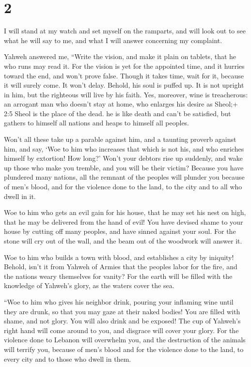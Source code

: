 \hypertarget{section-1}{%
\section{2}\label{section-1}}

 I will stand at my watch and set myself on the ramparts,
and will look out to see what he will say to me, and what I will answer
concerning my complaint.

 Yahweh answered me, ``Write the vision, and make it plain
on tablets, that he who runs may read it.  For the vision is
yet for the appointed time, and it hurries toward the end, and won't
prove false. Though it takes time, wait for it, because it will surely
come. It won't delay.  Behold, his soul is puffed up. It is
not upright in him, but the righteous will live by his faith.
 Yes, moreover, wine is treacherous: an arrogant man who
doesn't stay at home, who enlarges his desire as Sheol;+ 2:5 Sheol is
the place of the dead. he is like death and can't be satisfied, but
gathers to himself all nations and heaps to himself all peoples.

 Won't all these take up a parable against him, and a
taunting proverb against him, and say, `Woe to him who increases that
which is not his, and who enriches himself by extortion! How long?'
 Won't your debtors rise up suddenly, and wake up those who
make you tremble, and you will be their victim?  Because you
have plundered many nations, all the remnant of the peoples will plunder
you because of men's blood, and for the violence done to the land, to
the city and to all who dwell in it.

 Woe to him who gets an evil gain for his house, that he may
set his nest on high, that he may be delivered from the hand of evil!
 You have devised shame to your house by cutting off many
peoples, and have sinned against your soul.  For the stone
will cry out of the wall, and the beam out of the woodwork will answer
it.

 Woe to him who builds a town with blood, and establishes a
city by iniquity!  Behold, isn't it from Yahweh of Armies
that the peoples labor for the fire, and the nations weary themselves
for vanity?  For the earth will be filled with the
knowledge of Yahweh's glory, as the waters cover the sea.

 ``Woe to him who gives his neighbor drink, pouring your
inflaming wine until they are drunk, so that you may gaze at their naked
bodies!  You are filled with shame, and not glory. You will
also drink and be exposed! The cup of Yahweh's right hand will come
around to you, and disgrace will cover your glory.  For the
violence done to Lebanon will overwhelm you, and the destruction of the
animals will terrify you, because of men's blood and for the violence
done to the land, to every city and to those who dwell in them.

